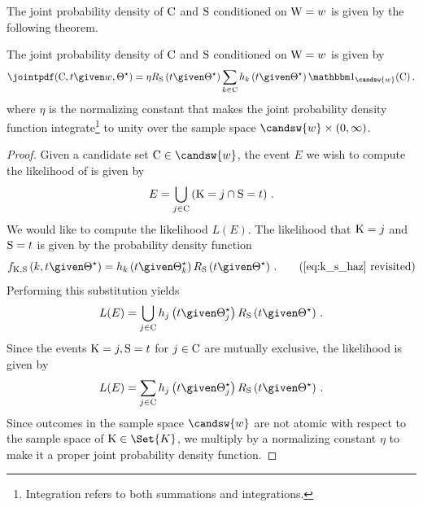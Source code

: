 \documentclass[../main.tex]{subfiles}
\begin{document}
The joint probability density of $\mathrm{C}$ and $\mathrm{S}$ conditioned on 
$\mathrm{W} = w$ is given by the following theorem.
\begin{theorem}
\label{thm:general_joint_likelihood_cand}
The joint probability density of $\mathrm{C}$ and $\mathrm{S}$ conditioned on $\mathrm{W} = 
w$ is given by
\begin{equation}
\label{eq:general_joint_likelihood_cand}
    \jointpdf(\cand, t \given w, \tparam\sysparam) = \eta
        \srv_{\sv}\left(t \given \tparam\sysparam\right)
        \sum_{k \in \cand} \haz_k\left(t \given \tparam\sysparam\right)
        \SetIndicator{\candsw{w}}(\cand)\,.
\end{equation}
where $\eta$ is the normalizing constant that makes the joint probability density function integrate\footnote{Integration refers to both summations and integrations.} to unity over the sample space $\candsw{w} \times \left(0,\infty\right)$.
\end{theorem}
\begin{proof}
Given a candidate set $\cand \in \candsw{w}$, the event $E$ we wish to compute the likelihood of is given by
\begin{equation}
    E = \bigcup_{j \in \mathrm{C}} \left ( \mathrm{K} = j \cap \mathrm{S} = t \right )\,.
\end{equation}
We would like to compute the likelihood $L(E)$. The likelihood that $\mathrm{K} = j$ and $\mathrm{S} = t$ is given by the probability density function
\begin{equation*}
    \pdf_{\RV{K}, \sv}\left(k, t\given \tparam\sysparam\right) = \haz_k\left(t \given \tparam{\sysparam}_k\right) \srv_{\sv}\left(t \given \tparam\sysparam\right)\,.
    \tag{\ref{eq:k_s_haz} revisited}
\end{equation*}
Performing this substitution yields
\begin{equation}
    L(E) = \bigcup_{j \in \cand} \haz_j\left(t \given \tparam{\sysparam}_j\right) \srv_{\sv}\left(t \given \tparam\sysparam\right)\,.
\end{equation}
Since the events $\mathrm{K} = j, \mathrm{S} = t$ for $j \in \mathrm{C}$ are mutually exclusive, the likelihood is given by
\begin{equation}
    L(E) = \sum_{j \in \cand} \haz_j\left(t \given \tparam{\sysparam}_j\right) \srv_{\sv}\left(t \given \tparam\sysparam\right)\,.
\end{equation}
Since outcomes in the sample space $\candsw{w}$ are not atomic with respect to 
the sample space of $\RV{K} \in \Set{K}$, we multiply by a normalizing constant 
$\eta$ to make it a proper joint probability density function.
\end{proof}
\end{document}
